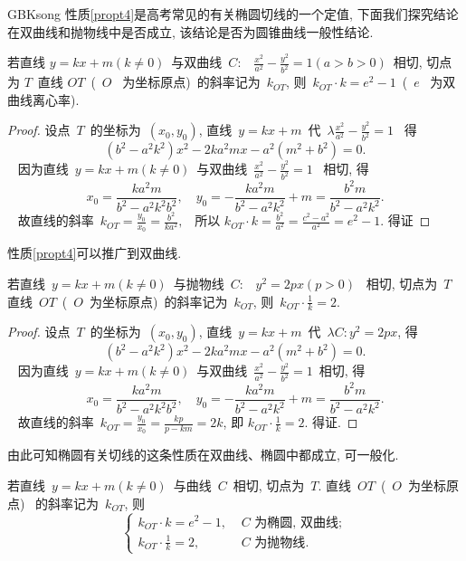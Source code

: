 \documentclass[a4paper, 12pt, twoside]{ctexart}
\begin{document}
\begin{CJK*}{GBK}{song}
    性质\ref{propt4}是高考常见的有关椭圆切线的一个定值, 下面我们探究结论在双曲线和抛物线中是否成立, 该结论是否为圆锥曲线一般性结论.
    \begin{propt}\label{propt5}
        若直线 $y=kx+m(k\ne0)$~与双曲线~$C:$~ $ \frac{x^2}{a^2}-\frac{y^2}{b^2}=1(a>b>0)$~相切, 切点为 $T$~直线 $OT$~(~$O$~ 为坐标原点)~的斜率记为~$k_{OT}$, 则~$k_{OT}\cdot k=e^2-1$~(~$e$~ 为双曲线离心率).
    \end{propt}
    \begin{proof}
        设点~$T$~的坐标为~$(x_0, y_0)$, 直线~$y=kx+m$~代~$\lambda \frac{x^2}{a^2}-\frac{y^2}{b^2}=1$~ 得
            $$~(b^2-a^2 k^2)x^2-2ka^2mx-a^2(m^2+b^2)=0.~$$~
        因为直线~$y=kx+m(k\ne0)$~与双曲线~$\frac{x^2}{a^2}-\frac{y^2}{b^2}=1$~ 相切,  得
        $$~x_0=\frac{ka^2m}{b^2-a^2k^2b^2},  \quad
        y_0=-\frac{ka^2m}{b^2-a^2k^2}+m =\frac{b^2m}{b^2-a^2k^2}.~$$~
        故直线的斜率~$k_{OT}=\frac{y_0}{x_0}=\frac{b^2}{k a^2}, $~ 所以 $k_{O T} \cdot k=\frac{b^2}{a^2}=\frac{c^2-a^2}{a^2}=e^2-1$. 得证
\end{proof}

    性质\ref{propt4}可以推广到双曲线.
    \begin{propt}\label{propt6}
        若直线~$y=kx+m(k\ne0)$~与抛物线~$C:$~ $y^2=2px(p>0)$~ 相切, 切点为~$T$~ 直线~$OT$~(~$O$~为坐标原点)~的斜率记为~$k_{OT}$, 则~$k_{OT}\cdot \frac{1}{k}=2$.
    \end{propt}
    \begin{proof}
        设点~$T$~的坐标为~$(x_0,y_0)$, 直线~$y=kx+m$~代~$\lambda C: y^2=2px$, 得
        $$~(b^2-a^2 k^2)x^2-2ka^2mx-a^2(m^2+b^2)=0.~$$~
        因为直线~$y=k x+m(k\ne0)$~与双曲线~$\frac{x^2}{a^2}-\frac{y^2}{b^2}=1$~相切, 得
            $$~x_0=\frac{k a^2 m}{b^2-a^2 k^2 b^2},  \quad y_0=-\frac{k a^2 m}{b^2-a^2 k^2}+m=\frac{b^2 m}{b^2-a^2 k^2}.~$$~
        故直线的斜率~$k_{OT}=\frac{y_0}{x_0}=\frac{kp}{p-km}=2k$, 即 $k_{O T} \cdot \frac{1}{k}=2$. 得证.
    \end{proof}

    由此可知椭圆有关切线的这条性质在双曲线、椭圆中都成立,  可一般化.
    \begin{coro}\label{coro2}
        若直线~$y=kx+m(k\ne0)$~与曲线~$C$~相切, 切点为~$T$. 直线~$OT$~(~$O$~为坐标原点)~ 的斜率记为~$k_{OT}$, 则
            $$~\begin{cases}
            k_{OT}\cdot k=e^2-1,&\text{~$C$~为椭圆, 双曲线};\\[-5pt]
            k_{OT}\cdot\frac 1k=2,&\text{~$C$~为抛物线}.
            \end{cases}~$$~
    \end{coro}


\end{CJK*}
\end{document}
